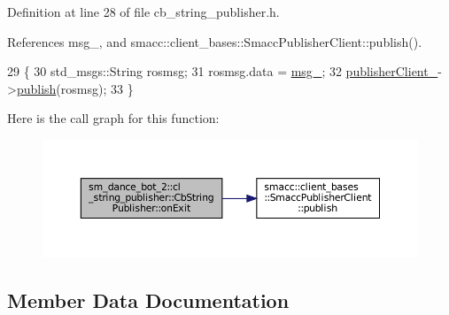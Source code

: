 Definition at line 28 of file cb\+\_\+string\+\_\+publisher.\+h.



References msg\+\_\+, and smacc\+::client\+\_\+bases\+::\+Smacc\+Publisher\+Client\+::publish().


\begin{DoxyCode}
29     \{
30         std\_msgs::String rosmsg;
31         rosmsg.data = \hyperlink{classsm__dance__bot__2_1_1cl__string__publisher_1_1CbStringPublisher_aa4ec5323d074594371424668619997da}{msg\_};
32         \hyperlink{classsm__dance__bot__2_1_1cl__string__publisher_1_1CbStringPublisher_a374db0f8b7ae20321f38c611108cb49a}{publisherClient\_}->\hyperlink{classsmacc_1_1client__bases_1_1SmaccPublisherClient_a083abb0f5c0f587f3381a58fe1fe3669}{publish}(rosmsg);
33     \}
\end{DoxyCode}
Here is the call graph for this function\+:
\nopagebreak
\begin{figure}[H]
\begin{center}
\leavevmode
\includegraphics[width=350pt]{classsm__dance__bot__2_1_1cl__string__publisher_1_1CbStringPublisher_aee990acdb5ec33f1d22efafbe32216f2_cgraph}
\end{center}
\end{figure}


\subsection{Member Data Documentation}
\mbox{\label{classsm__dance__bot__2_1_1cl__string__publisher_1_1CbStringPublisher_aa4ec5323d074594371424668619997da}} 
